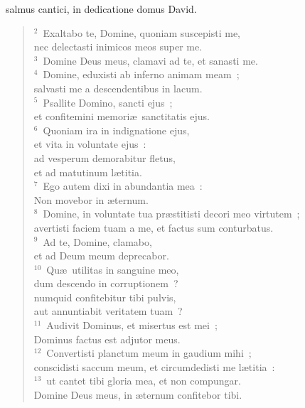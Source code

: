 \bchapter
{}salmus cantici, in dedicatione domus David.
\begin{flushleft}\begin{verse}\vspace{6pt}${}^{2}$~Exaltabo te, Domine, quoniam suscepisti me,\\ nec delectasti inimicos meos super me.\\
${}^{3}$~Domine Deus meus, clamavi ad te, et sanasti me.\\
${}^{4}$~Domine, eduxisti ab inferno animam meam~;\\ salvasti me a descendentibus in lacum.\\
${}^{5}$~Psallite Domino, sancti ejus~;\\ et confitemini memori\ae\ sanctitatis ejus.\\
${}^{6}$~Quoniam ira in indignatione ejus,\\ et vita in voluntate ejus~:\\ ad vesperum demorabitur fletus,\\ et ad matutinum l\ae titia.\\
${}^{7}$~Ego autem dixi in abundantia mea~:\\ Non movebor in \ae ternum.\\
${}^{8}$~Domine, in voluntate tua pr\ae stitisti decori meo virtutem~;\\ avertisti faciem tuam a me, et factus sum conturbatus.\\
${}^{9}$~Ad te, Domine, clamabo,\\ et ad Deum meum deprecabor.\\
${}^{10}$~Qu\ae\ utilitas in sanguine meo,\\ dum descendo in corruptionem~?\\ numquid confitebitur tibi pulvis,\\ aut annuntiabit veritatem tuam~?\\
${}^{11}$~Audivit Dominus, et misertus est mei~;\\ Dominus factus est adjutor meus.\\
${}^{12}$~Convertisti planctum meum in gaudium mihi~;\\ conscidisti saccum meum, et circumdedisti me l\ae titia~:\\
${}^{13}$~ut cantet tibi gloria mea, et non compungar.\\ Domine Deus meus, in \ae ternum confitebor tibi.\end{verse}\end{flushleft}



